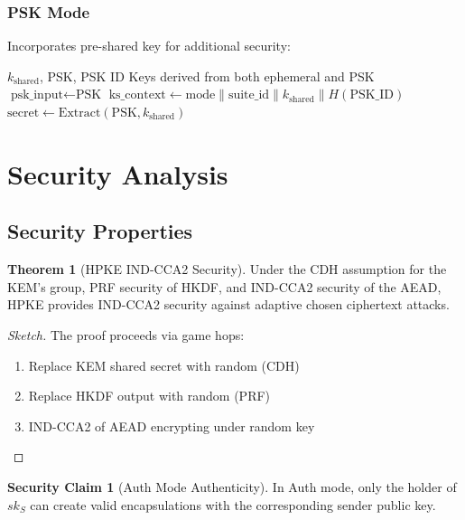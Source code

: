 \documentclass[11pt,a4paper]{article}
\theoremstyle{definition}
\newtheorem{theorem}{Theorem}
\newtheorem{security}{Security Claim}
\begin{document}
\subsubsection{PSK Mode}

Incorporates pre-shared key for additional security:

\begin{algorithm}
\caption{HPKE PSK Mode Key Schedule}
\begin{algorithmic}[1]
\Require $k_{\text{shared}}$, PSK, PSK ID
\Ensure Keys derived from both ephemeral and PSK
\State $\text{psk\_input} \gets \text{PSK}$
\State $\text{ks\_context} \gets \text{mode} \| \text{suite\_id} \| k_{\text{shared}} \| H(\text{PSK\_ID})$
\State $\text{secret} \gets \text{Extract}(\text{PSK}, k_{\text{shared}})$
\end{algorithmic}
\end{algorithm}

\section{Security Analysis}

\subsection{Security Properties}

\begin{theorem}[HPKE IND-CCA2 Security]
Under the CDH assumption for the KEM's group, PRF security of HKDF, and IND-CCA2 security of the AEAD, HPKE provides IND-CCA2 security against adaptive chosen ciphertext attacks.
\end{theorem}

\begin{proof}[Sketch]
The proof proceeds via game hops:
\begin{enumerate}
\item Replace KEM shared secret with random (CDH)
\item Replace HKDF output with random (PRF)
\item IND-CCA2 of AEAD encrypting under random key
\end{enumerate}
\end{proof}

\begin{security}[Auth Mode Authenticity]
In Auth mode, only the holder of $sk_S$ can create valid encapsulations with the corresponding sender public key.
\end{security}
\end{document}
